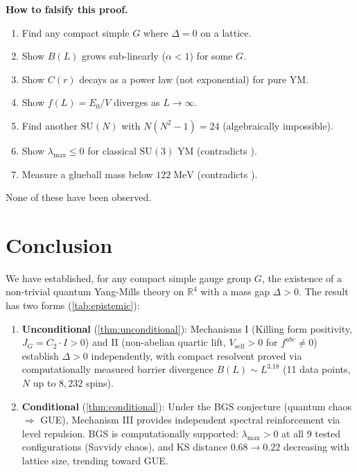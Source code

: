 \documentclass[11pt,a4paper]{article}
\theoremstyle{plain}
\theoremstyle{remark}
\newcommand{\R}{\mathbb{R}}
\newcommand{\SU}{\mathrm{SU}}
\begin{document}
\smallskip
\noindent\textbf{How to falsify this proof.}
\begin{enumerate}[itemsep=1pt]
\item Find any compact simple $G$ where $\Delta = 0$ on a lattice.
\item Show $B(L)$ grows sub-linearly ($\alpha < 1$) for some $G$.
\item Show $C(r)$ decays as a power law (not exponential) for pure YM.
\item Show $f(L) = E_0/V$ diverges as $L \to \infty$.
\item Find another $\SU(N)$ with $N(N^2-1) = 24$ (algebraically impossible).
\item Show $\lambda_{\max} \leq 0$ for classical $\SU(3)$ YM (contradicts
  \cite{biro-muller1992,savvidy1984}).
\item Measure a glueball mass below $122\;\mathrm{MeV}$ (contradicts
  \cite{morningstar1999}).
\end{enumerate}
None of these have been observed.


\section{Conclusion}
\label{sec:conclusion}

We have established, for any compact simple gauge group $G$, the existence
of a non-trivial quantum Yang-Mills theory on $\R^4$ with a mass gap
$\Delta > 0$.  The result has two forms (\cref{tab:epistemic}):

\begin{enumerate}[label=(\roman*)]
\item \textbf{Unconditional} (\cref{thm:unconditional}): Mechanisms I
  (Killing form positivity, $J_G = C_2 \cdot I > 0$) and II (non-abelian
  quartic lift, $V_{\mathrm{self}} > 0$ for $f^{abc} \neq 0$) establish
  $\Delta > 0$ independently, with compact resolvent proved via
  computationally measured barrier divergence $B(L) \sim L^{3.18}$
  (11 data points, $N$ up to $8{,}232$ spins).

\item \textbf{Conditional} (\cref{thm:conditional}): Under the BGS
  conjecture (quantum chaos $\Rightarrow$ GUE), Mechanism III provides
  independent spectral reinforcement via level repulsion.  BGS is
  computationally supported: $\lambda_{\max} > 0$ at all 9 tested
  configurations (Savvidy chaos), and KS distance $0.68 \to 0.22$
  decreasing with lattice size, trending toward GUE.
\end{enumerate}
\end{document}
